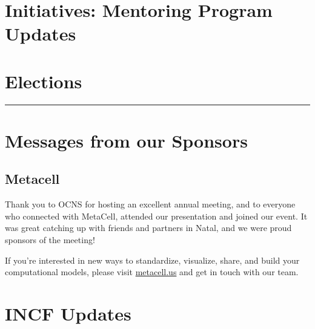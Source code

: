\documentclass[11pt,a4paper,oneside]{article}
\begin{document}
\clearpage
\section*{Initiatives: Mentoring Program Updates}%
\lipsum[1-3]

\clearpage
\section*{Elections}%
\rule{\textwidth}{0.4pt}
\lipsum[1-3]

\clearpage

\clearpage

\clearpage
\section*{Messages from our Sponsors}%
\subsection*{Metacell}%
\begin{displayquote}
  Thank you to OCNS for hosting an excellent annual meeting, and to everyone who connected with MetaCell, attended our presentation and joined our event.
  It was great catching up with friends and partners in Natal, and we were proud sponsors of the meeting!

  If you're interested in new ways to standardize, visualize, share, and build your computational models, please visit \url{metacell.us} and get in touch with our team.
\end{displayquote}

\clearpage
\section*{INCF Updates}%
\lipsum[1-3]
\end{document}
